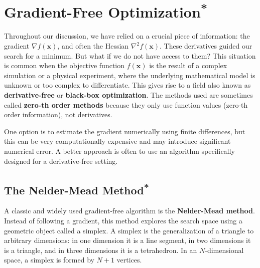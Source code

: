 \section{\texorpdfstring{Gradient-Free Optimization\textsuperscript{*}}{Gradient-Free Optimization}}
\label{sec:gradient-free-optimization}


Throughout our discussion, we have relied on a crucial piece of information: the gradient $\nabla f(\mathbf{x})$, and often the Hessian $\nabla^2 f(\mathbf{x})$. These derivatives guided our search for a minimum. But what if we do not have access to them? This situation is common when the objective function $f(\mathbf{x})$ is the result of a complex simulation or a physical experiment, where the underlying mathematical model is unknown or too complex to differentiate. This gives rise to a field also known as \textbf{derivative-free} or \textbf{black-box optimization}. The methods used are sometimes called \textbf{zero-th order methods} because they only use function values (zero-th order information), not derivatives.

One option is to estimate the gradient numerically using finite differences, but this can be very computationally expensive and may introduce significant numerical error. A better approach is often to use an algorithm specifically designed for a derivative-free setting.

\subsection{\texorpdfstring{The Nelder-Mead Method\textsuperscript{*}}{The Nelder-Mead Method}}
\label{sec:nelder-mead-method}

A classic and widely used gradient-free algorithm is the \textbf{Nelder-Mead method}. Instead of following a gradient, this method explores the search space using a geometric object called a simplex. A simplex is the generalization of a triangle to arbitrary dimensions: in one dimension it is a line segment, in two dimensions it is a triangle, and in three dimensions it is a tetrahedron. In an $N$-dimensional space, a simplex is formed by $N+1$ vertices.

